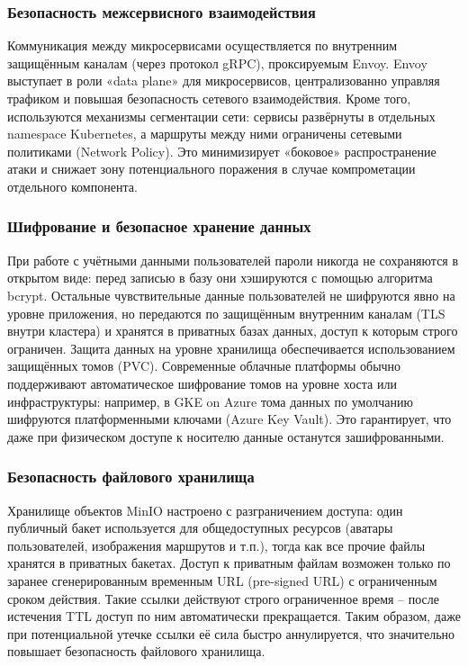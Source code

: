 \subsubsection*{Безопасность межсервисного взаимодействия}
Коммуникация между микросервисами осуществляется по внутренним защищённым каналам (через протокол gRPC), проксируемым Envoy. Envoy выступает в роли «data plane» для микросервисов, централизованно управляя трафиком и повышая безопасность сетевого взаимодействия. Кроме того, используются механизмы сегментации сети: сервисы развёрнуты в отдельных namespace Kubernetes, а маршруты между ними ограничены сетевыми политиками (Network Policy). Это минимизирует «боковое» распространение атаки и снижает зону потенциального поражения в случае компрометации отдельного компонента.

\subsubsection*{Шифрование и безопасное хранение данных}
При работе с учётными данными пользователей пароли никогда не сохраняются в открытом виде: перед записью в базу они хэшируются с помощью алгоритма bcrypt. Остальные чувствительные данные пользователей не шифруются явно на уровне приложения, но передаются по защищённым внутренним каналам (TLS внутри кластера) и хранятся в приватных базах данных, доступ к которым строго ограничен. Защита данных на уровне хранилища обеспечивается использованием защищённых томов (PVC). Современные облачные платформы обычно поддерживают автоматическое шифрование томов на уровне хоста или инфраструктуры: например, в GKE on Azure тома данных по умолчанию шифруются платформенными ключами (Azure Key Vault). Это гарантирует, что даже при физическом доступе к носителю данные останутся зашифрованными.

\subsubsection*{Безопасность файлового хранилища}
Хранилище объектов MinIO настроено с разграничением доступа: один публичный бакет используется для общедоступных ресурсов (аватары пользователей, изображения маршрутов и т.п.), тогда как все прочие файлы хранятся в приватных бакетах. Доступ к приватным файлам возможен только по заранее сгенерированным временным URL (pre-signed URL) с ограниченным сроком действия. Такие ссылки действуют строго ограниченное время – после истечения TTL доступ по ним автоматически прекращается. Таким образом, даже при потенциальной утечке ссылки её сила быстро аннулируется, что значительно повышает безопасность файлового хранилища.

